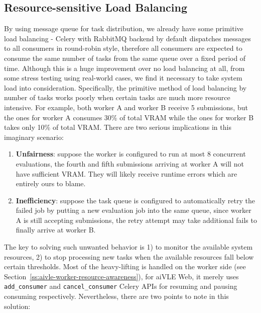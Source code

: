 \subsection{Resource-sensitive Load Balancing}
\label{ss:aivle-web-load-balancing}
By using message queue for task distribution, we already have some primitive load balancing - Celery with RabbitMQ backend by default dispatches messages to all consumers in round-robin style, therefore all consumers are expected to consume the same number of tasks from the same queue over a fixed period of time. Although this is a huge improvement over no load balancing at all, from some stress testing using real-world cases, we find it necessary to take system load into consideration. Specifically, the primitive method of load balancing by number of tasks works poorly when certain tasks are much more resource intensive. For example, both worker A and worker B receive 5 submissions, but the ones for worker A consumes 30\% of total VRAM while the ones for worker B takes only 10\% of total VRAM. There are two serious implications in this imaginary scenario:
\begin{enumerate}
    \item \textbf{Unfairness}: suppose the worker is configured to run at most 8 concurrent evaluations, the fourth and fifth submissions arriving at worker A will not have sufficient VRAM. They will likely receive runtime errors which are entirely ours to blame.
    \item \textbf{Inefficiency}: suppose the task queue is configured to automatically retry the failed job by putting a new evaluation job into the same queue, since worker A is still accepting submissions, the retry attempt may take additional fails to finally arrive at worker B.
\end{enumerate}

The key to solving such unwanted behavior is 1) to monitor the available system resources, 2) to stop processing new tasks when the available resources fall below certain thresholds. Most of the heavy-lifting is handled on the worker side (see Section~\ref{ss:aivle-worker-resource-awareness}), for aiVLE Web, it merely uses \texttt{add\_consumer} and \texttt{cancel\_consumer} Celery APIs for resuming and pausing consuming respectively. Nevertheless, there are two points to note in this solution:

